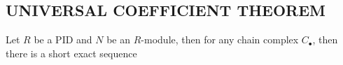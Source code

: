 \documentclass{report}
\begin{document}
\subsection{UNIVERSAL COEFFICIENT THEOREM}

\begin{theorem}
    Let $R$ be a PID and $N$ be an $R$-module, then for any chain complex $C_\bullet$, then there is a short exact sequence
    \begin{center}
    \end{center}
\end{theorem}
\end{document}
